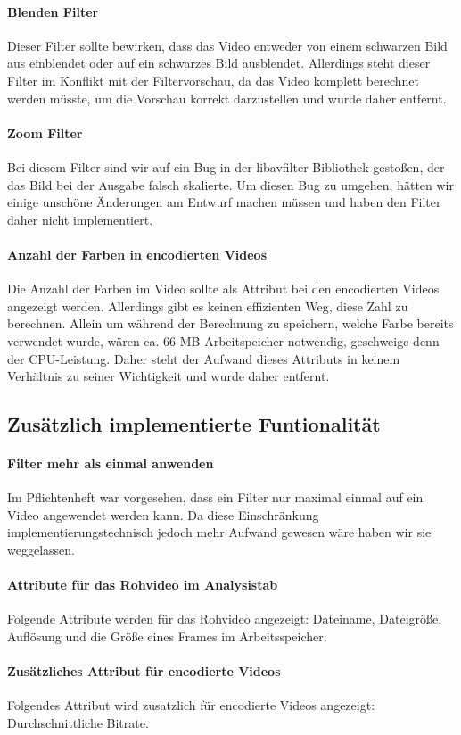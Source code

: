 \documentclass{scrartcl}
\begin{document}
{\paragraph{Blenden Filter} Dieser Filter sollte bewirken, dass das Video entweder von einem schwarzen Bild aus einblendet oder auf ein schwarzes Bild ausblendet. Allerdings steht dieser Filter im Konflikt mit der Filtervorschau, da das Video komplett berechnet werden müsste, um die Vorschau korrekt darzustellen und wurde daher entfernt.
\paragraph{Zoom Filter} Bei diesem Filter sind wir auf ein Bug in der libavfilter Bibliothek gestoßen, der das Bild bei der Ausgabe falsch skalierte. Um diesen Bug zu umgehen, hätten wir einige unschöne Änderungen am Entwurf machen müssen und haben den Filter daher nicht implementiert.
\paragraph{Anzahl der Farben in encodierten Videos} Die Anzahl der Farben im Video sollte als Attribut bei den encodierten Videos angezeigt werden. Allerdings gibt es keinen effizienten Weg, diese Zahl zu berechnen. Allein um während der Berechnung zu speichern, welche Farbe bereits verwendet wurde, wären ca. 66 MB Arbeitspeicher notwendig, geschweige denn der CPU-Leistung. Daher steht der Aufwand dieses Attributs in keinem Verhältnis zu seiner Wichtigkeit und wurde daher entfernt.
\newpage
\subsection{Zusätzlich implementierte Funtionalität}
\bigskip
\paragraph{Filter mehr als einmal anwenden} Im Pflichtenheft war vorgesehen, dass ein Filter nur maximal einmal auf ein Video angewendet werden kann. Da diese Einschränkung implementierungstechnisch jedoch mehr Aufwand gewesen wäre haben wir sie weggelassen.
\paragraph{Attribute für das Rohvideo im Analysistab} Folgende Attribute werden für das Rohvideo angezeigt: Dateiname, Dateigröße, Auflösung und die Größe eines Frames im Arbeitsspeicher.
\paragraph{Zusätzliches Attribut für encodierte Videos} Folgendes Attribut wird zusatzlich für encodierte Videos angezeigt: Durchschnittliche Bitrate.
}
\end{document}
